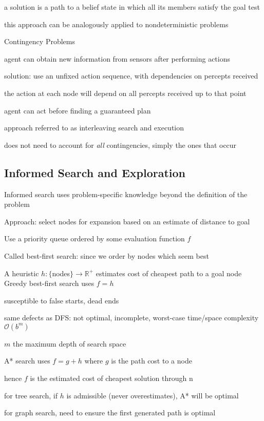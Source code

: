 \documentclass[12pt]{article}
\begin{document}
a solution is a path to a belief state in which all its members satisfy the goal test

this approach can be analogously applied to nondeterministic problems

\noindent
Contingency Problems

agent can obtain new information from sensors after performing actions

solution: use an unfixed action sequence, with dependencies on percepts received

the action at each node will depend on all percepts received up to that point

agent can act before finding a guaranteed plan

approach referred to as interleaving search and execution

does not need to account for \textit{all} contingencies, simply the ones that occur

\subsection{Informed Search and Exploration}

\noindent
Informed search uses problem-specific knowledge beyond the definition of the problem

\noindent
Approach: select nodes for expansion based on an estimate of distance to goal

Use a priority queue ordered by some evaluation function $f$

Called best-first search: since we order by nodes which seem best

A heuristic $h: \{$nodes$\} \to \mathds{R}^+$ estimates cost of cheapest path to a goal node\\

\noindent
Greedy best-first search uses $f = h$

susceptible to false starts, dead ends

same defects as DFS: not optimal, incomplete, worst-case time/space complexity $\mathcal{O}(b^m)$

$m$ the maximum depth of search space

\noindent
A* search uses $f = g + h$ where $g$ is the path cost to a node

hence $f$ is the estimated cost of cheapest solution through n

for tree search, if $h$ is admissible (never overestimates), A* will be optimal

for graph search, need to ensure the first generated path is optimal
\end{document}
